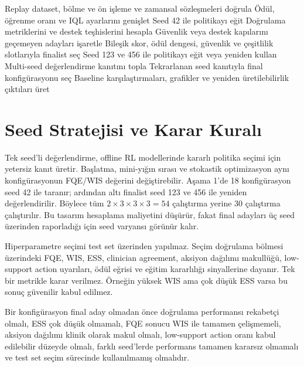 \documentclass[conference]{IEEEtran}
\begin{document}
\begin{algorithm}[t]
\caption{Nihai deney taraması ve raporlama iş akışı}
\label{alg:workflow}
\begin{algorithmic}[1]
\STATE Replay dataset, bölme ve ön işleme ve zamansal sözleşmeleri doğrula
\STATE Ödül, öğrenme oranı ve IQL ayarlarını genişlet
 \STATE Seed 42 ile politikayı eğit
 \STATE Doğrulama metriklerini ve destek teşhislerini hesapla
\ENDFOR
\STATE Güvenlik veya destek kapılarını geçemeyen adayları işaretle
\STATE Bileşik skor, ödül dengesi, güvenlik ve çeşitlilik slotlarıyla finalist seç
 \STATE Seed 123 ve 456 ile politikayı eğit veya yeniden kullan
 \STATE Multi-seed değerlendirme kanıtını topla
\ENDFOR
\STATE Tekrarlanan seed kanıtıyla final konfigürasyonu seç
\STATE Baseline karşılaştırmaları, grafikler ve yeniden üretilebilirlik çıktıları üret
\end{algorithmic}
\end{algorithm}

\section{Seed Stratejisi ve Karar Kuralı}
Tek seed'li değerlendirme, offline RL modellerinde kararlı politika seçimi için yetersiz kanıt üretir. Başlatma, mini-yığın sırası ve stokastik optimizasyon aynı konfigürasyonun FQE/WIS değerini değiştirebilir. Aşama 1'de 18 konfigürasyon seed 42 ile taranır; ardından altı finalist seed 123 ve 456 ile yeniden değerlendirilir. Böylece tüm $2\times3\times3\times3=54$ çalıştırma yerine 30 çalıştırma çalıştırılır. Bu tasarım hesaplama maliyetini düşürür, fakat final adayları üç seed üzerinden raporladığı için seed varyansı görünür kalır.

Hiperparametre seçimi test set üzerinden yapılmaz. Seçim doğrulama bölmesi üzerindeki FQE, WIS, ESS, clinician agreement, aksiyon dağılımı makullüğü, low-support action uyarıları, ödül eğrisi ve eğitim kararlılığı sinyallerine dayanır. Tek bir metrikle karar verilmez. Örneğin yüksek WIS ama çok düşük ESS varsa bu sonuç güvenilir kabul edilmez.

Bir konfigürasyon final aday olmadan önce doğrulama performansı rekabetçi olmalı, ESS çok düşük olmamalı, FQE sonucu WIS ile tamamen çelişmemeli, aksiyon dağılımı klinik olarak makul olmalı, low-support action oranı kabul edilebilir düzeyde olmalı, farklı seed'lerde performans tamamen kararsız olmamalı ve test set seçim sürecinde kullanılmamış olmalıdır.
\end{document}
